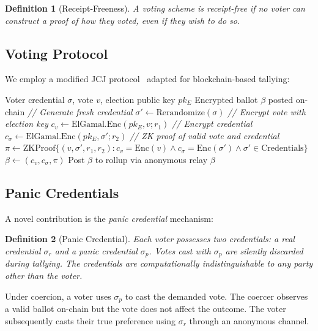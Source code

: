 \documentclass[11pt,a4paper]{article}
\newtheorem{definition}{Definition}
\begin{document}
\begin{definition}[Receipt-Freeness]
A voting scheme is receipt-free if no voter can construct a proof of how they voted, even if they wish to do so.
\end{definition}

\subsection{Voting Protocol}

We employ a modified JCJ protocol~\cite{juels2005coercion} adapted for blockchain-based tallying:

\begin{algorithm}[H]
\caption{Coercion-Resistant Vote Casting}
\label{alg:vote}
\begin{algorithmic}[1]
\Require Voter credential $\sigma$, vote $v$, election public key $pk_E$
\Ensure Encrypted ballot $\beta$ posted on-chain
\State \textit{// Generate fresh credential}
\State $\sigma' \gets \text{Rerandomize}(\sigma)$
\State \textit{// Encrypt vote with election key}
\State $c_v \gets \text{ElGamal.Enc}(pk_E, v; r_1)$
\State \textit{// Encrypt credential}
\State $c_\sigma \gets \text{ElGamal.Enc}(pk_E, \sigma'; r_2)$
\State \textit{// ZK proof of valid vote and credential}
\State $\pi \gets \text{ZKProof}\{(v, \sigma', r_1, r_2) : c_v = \text{Enc}(v) \land c_\sigma = \text{Enc}(\sigma') \land \sigma' \in \text{Credentials}\}$
\State $\beta \gets (c_v, c_\sigma, \pi)$
\State Post $\beta$ to rollup via anonymous relay
\State \Return $\beta$
\end{algorithmic}
\end{algorithm}

\subsection{Panic Credentials}

A novel contribution is the \emph{panic credential} mechanism:

\begin{definition}[Panic Credential]
Each voter possesses two credentials: a \emph{real credential} $\sigma_r$ and a \emph{panic credential} $\sigma_p$. Votes cast with $\sigma_p$ are silently discarded during tallying. The credentials are computationally indistinguishable to any party other than the voter.
\end{definition}

Under coercion, a voter uses $\sigma_p$ to cast the demanded vote. The coercer observes a valid ballot on-chain but the vote does not affect the outcome. The voter subsequently casts their true preference using $\sigma_r$ through an anonymous channel.
\end{document}
